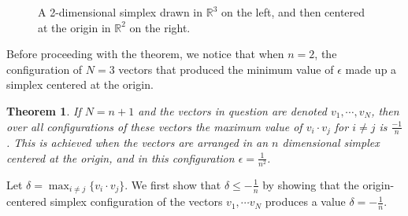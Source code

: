 \documentclass[11pt,letterpaper,twoside,english]{article}
\theoremstyle{theorem}
\newtheorem{theorem}{Theorem}[section]
\theoremstyle{remark}
\providecommand{\R}{\mathbb{R}}
\begin{document}
\begin{figure}[!h]
    \centering
    \caption{A 2-dimensional simplex drawn in $\R^3$ on the left, and then centered at the origin in $\R^2$ on the right.}
\end{figure}

Before proceeding with the theorem, we notice that when $n=2$, the configuration of $N=3$ vectors that produced the minimum value of $\epsilon$ made up a simplex centered at the origin. 


\begin{theorem}
If $N=n+1$ and the vectors in question are denoted $v_1,\cdots, v_N$, then over all configurations of these vectors the maximum value of $v_i\cdot v_j$ for $i\neq j$ is $\frac{-1}{n}$. This is achieved when the vectors are arranged in an $n$ dimensional simplex centered at the origin, and in this configuration $\epsilon=\frac{1}{n^2}$.  
\end{theorem}

\proof
Let $\delta=\max_{i\neq j}\{v_i\cdot v_j\}$. We first show that $\delta\le-\frac{1}{n}$ by showing that the origin-centered simplex configuration of the vectors $v_1,\cdots v_N$ produces a value $\delta=-\frac{1}{n}$. 
\end{document}
